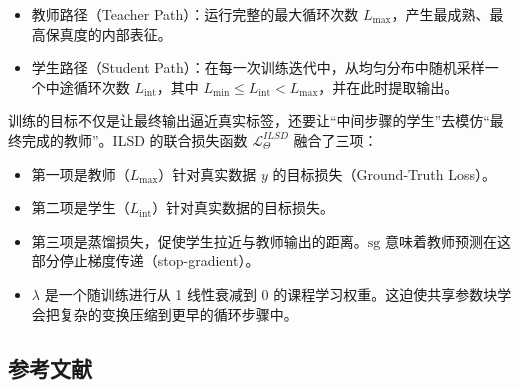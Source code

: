 \begin{itemize}
\tightlist
\item
  教师路径（Teacher Path）：运行完整的最大循环次数 \(L_{\max}\)，产生最成熟、最高保真度的内部表征。
\item
  学生路径（Student Path）：在每一次训练迭代中，从均匀分布中随机采样一个中途循环次数 \(L_{\mathrm{int}}\)，其中 \(L_{\min}\le L_{\mathrm{int}}\lt L_{\max}\)，并在此时提取输出。
\end{itemize}

训练的目标不仅是让最终输出逼近真实标签，还要让``中间步骤的学生''去模仿``最终完成的教师''。ILSD 的联合损失函数 \(\mathcal{L}^{ILSD}_{\Theta}\) 融合了三项：

\begin{itemize}
\tightlist
\item
  第一项是教师（\(L_{\max}\)）针对真实数据 \(y\) 的目标损失（Ground-Truth Loss）。
\item
  第二项是学生（\(L_{\mathrm{int}}\)）针对真实数据的目标损失。
\item
  第三项是蒸馏损失，促使学生拉近与教师输出的距离。\(\mathrm{sg}\) 意味着教师预测在这部分停止梯度传递（stop-gradient）。
\item
  \(\lambda\) 是一个随训练进行从 1 线性衰减到 0 的课程学习权重。这迫使共享参数块学会把复杂的变换压缩到更早的循环步骤中。
\end{itemize}

\FloatBarrier
{}
\hypertarget{ux53c2ux8003ux6587ux732e-141}{%
\subsection{参考文献}\label{ux53c2ux8003ux6587ux732e-141}}

